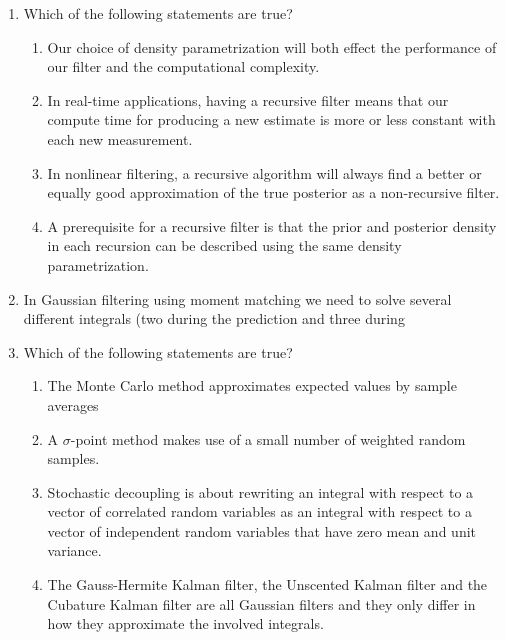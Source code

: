 \begin{enumerate}
\item Which of the following statements are true?

\begin{enumerate}
\item Our choice of density parametrization will both effect the performance of our filter and the computational complexity. 
\item In real-time applications, having a recursive filter means that our compute time for producing a new estimate is more or less constant with each new measurement. 
\item In nonlinear filtering, a recursive algorithm will always find a better or equally good approximation of the true posterior as a non-recursive filter. 
\item A prerequisite for a recursive filter is that the prior and posterior density in each recursion can be described using the same density parametrization. 
\end{enumerate}

\item  In Gaussian filtering using moment matching we need to solve several different integrals (two during the prediction and three during 

\item  Which of the following statements are true?

\begin{enumerate}
\item The Monte Carlo method approximates expected values by sample averages
\item A $\sigma$-point method makes use of a small number of weighted random samples. 
\item Stochastic decoupling is about rewriting an integral with respect to a vector of correlated random variables as an integral with respect 
to a vector of independent random variables that have zero mean and unit variance. 
\item The Gauss-Hermite Kalman filter, the Unscented Kalman filter and the Cubature Kalman filter are all Gaussian filters and they only differ in how they approximate the involved integrals. 
\end{enumerate}
\end{enumerate}


